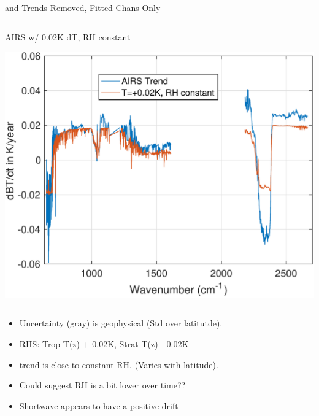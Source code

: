 \documentclass[10pt,t]{beamer}
\begin{document}
\begin{frame}[label={sec:orga4bf877}]{\cd and \methane Trends Removed, Fitted Chans Only}
\begin{columns}
\begin{column}{0.55\columnwidth}
\begin{block}{\footnotesize AIRS w/ 0.02K dT, RH constant}
\vspace{-0.1in}
\begin{center}
\includegraphics[width=\linewidth]{./Figs/Pdf/dbt_constantRH_dsurf_dtrop=0.02k_dstrat=m0.02k_withAIRS.pdf}
\end{center}
\end{block}
\end{column}
\end{columns}

\begin{small}
\begin{itemize}
\item Uncertainty (gray) is geophysical (Std over latitutde).
\item RHS: Trop T(z) + 0.02K, Strat T(z) - 0.02K
\item \water trend is close to constant RH. (Varies with latitude).
\item Could suggest RH is a bit lower over time??
\item Shortwave appears to have a positive drift
\end{itemize}
\end{small}
\end{frame}
\end{document}
